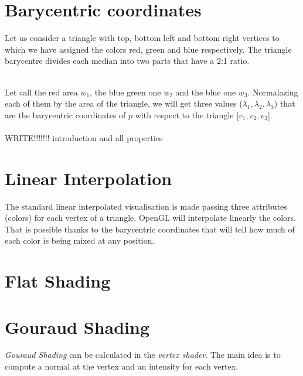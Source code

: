 \section{Barycentric coordinates}
Let us consider a triangle with top, bottom left and bottom right vertices to which we have assigned the colors red, green and blue respectively. The triangle barycentre divides each median into two parts that have a 2:1 ratio. \\
    \\
    Let call the red area $w_1$, the blue green one $w_2$ and the blue one $w_3$. Normalazing each of them by the area of the triangle, we will get three values ($\lambda_1, \lambda_2, \lambda_3$) that are the barycentric coordinates of $p$ with respect to the triangle [$v_1, v_2, v_3$].
\\ \\ WRITE!!!!!!! introduction and all properties

\section{Linear Interpolation}
The standard linear interpolated visualisation is made passing three attributes (colors) for each vertex of a triangle. OpenGL will interpolate linearly the colors. That is possible thanks to the barycentric coordinates that will tell how much of each color is being mixed at any position.

\section{Flat Shading}

\section{Gouraud Shading}
\textit{Gouraud Shading} can be calculated in the \textit{vertex shader}. The main idea is to compute a normal at the vertex and an intensity for each vertex.


